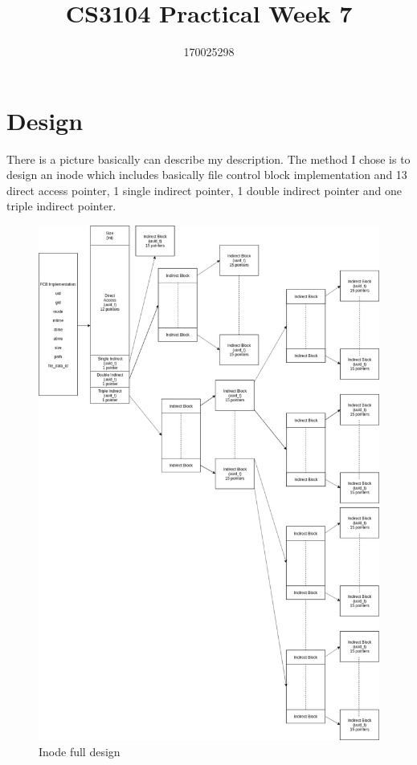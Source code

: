 \documentclass[legalpaper]{article}
\title{\vspace{-4cm}CS3104 Practical Week 7}
\author{170025298}
\date{}
\begin{document}
	\maketitle
	\section{Design}
	There is a picture basically can describe my description. The method I chose is to design an inode which includes basically file control block implementation and 13 direct access pointer, 1 single indirect pointer, 1 double indirect pointer and one triple indirect pointer.\par
	\begin{figure}[h!]
	\centering
	\includegraphics[width = \textwidth]{inode}
	\caption{Inode full design}
	\end{figure}
\end{document}
